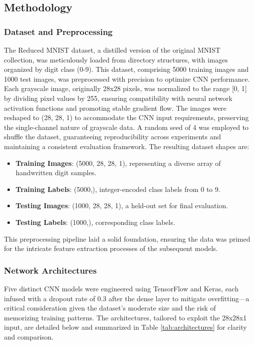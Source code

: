 \documentclass[12pt]{article}
\begin{document}
\newpage
\subsection{Methodology}

\subsubsection{Dataset and Preprocessing}
The Reduced MNIST dataset, a distilled version of the original MNIST collection, was meticulously loaded from directory structures, with images organized by digit class (0-9). This dataset, comprising 5000 training images and 1000 test images, was preprocessed with precision to optimize CNN performance. Each grayscale image, originally 28x28 pixels, was normalized to the range [0, 1] by dividing pixel values by 255, ensuring compatibility with neural network activation functions and promoting stable gradient flow. The images were reshaped to (28, 28, 1) to accommodate the CNN input requirements, preserving the single-channel nature of grayscale data. A random seed of 4 was employed to shuffle the dataset, guaranteeing reproducibility across experiments and maintaining a consistent evaluation framework. The resulting dataset shapes are:
\begin{itemize}
    \item \textbf{Training Images}: (5000, 28, 28, 1), representing a diverse array of handwritten digit samples.
    \item \textbf{Training Labels}: (5000,), integer-encoded class labels from 0 to 9.
    \item \textbf{Testing Images}: (1000, 28, 28, 1), a held-out set for final evaluation.
    \item \textbf{Testing Labels}: (1000,), corresponding class labels.
\end{itemize}
This preprocessing pipeline laid a solid foundation, ensuring the data was primed for the intricate feature extraction processes of the subsequent models.

\subsubsection{Network Architectures}
Five distinct CNN models were engineered using TensorFlow and Keras, each infused with a dropout rate of 0.3 after the dense layer to mitigate overfitting—a critical consideration given the dataset's moderate size and the risk of memorizing training patterns. The architectures, tailored to exploit the 28x28x1 input, are detailed below and summarized in Table \ref{tab:architectures} for clarity and comparison.
\end{document}
